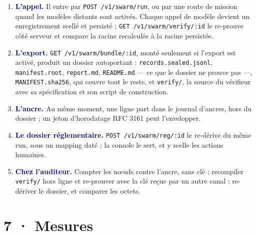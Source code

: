 \documentclass[10pt]{extarticle}
\newcommand{\code}[1]{\texttt{\small #1}}
\newcommand{\mm}[1]{\textbf{\textcolor{navy}{#1}}}
\begin{document}
\begin{enumerate}[leftmargin=1.4em,itemsep=1.5pt,topsep=1pt]
\item \mm{L'appel.} Il entre par \code{POST /v1/swarm/run}, ou par une route de mission quand les modèles distants
sont activés. Chaque appel de modèle devient un enregistrement scellé et persisté ; \code{GET /v1/swarm/verify/:id}
le re-prouve côté serveur et compare la racine recalculée à la racine persistée.
\item \mm{L'export.} \code{GET /v1/swarm/bundle/:id}, monté seulement si l'export est activé, produit un dossier
autoportant : \code{records.sealed.jsonl}, \code{manifest.root}, \code{report.md}, \code{README.md} --- ce que le
dossier ne prouve pas ---, \code{MANIFEST.sha256}, qui couvre tout le reste, et \code{verify/}, la source du
vérifieur avec sa spécification et son script de construction.
\item \mm{L'ancre.} Au même moment, une ligne part dans le journal d'ancres, hors du dossier ; un jeton d'horodatage
RFC 3161 peut l'envelopper.
\item \mm{Le dossier réglementaire.} \code{POST /v1/swarm/reg/:id} le re-dérive du même run, sous un mapping daté ; la
console le sert, et y scelle les actions humaines.
\item \mm{Chez l'auditeur.} Compter les nœuds contre l'ancre, sans clé ; recompiler \code{verify/} hors ligne et
re-prouver avec la clé reçue par un autre canal ; re-dériver le dossier, et comparer les octets.
\end{enumerate}

\section{7 · Mesures}
\end{document}
